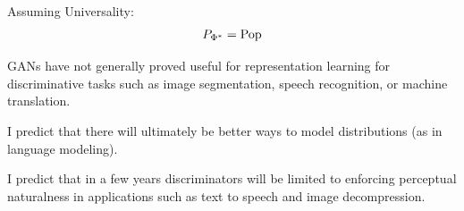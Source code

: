 {\vfill
Assuming Universality:
{\color{red} $$P_{\Phi^*} = \mathrm{Pop}$$}


GANs have not generally proved useful for representation learning for discriminative tasks
such as image segmentation, speech recognition, or machine translation.

\vfill
I predict that there will ultimately be better ways to model distributions (as in language modeling).

\vfill
I predict that in a few years discriminators will be limited to enforcing perceptual naturalness in applications such as
text to speech and image decompression.


}

